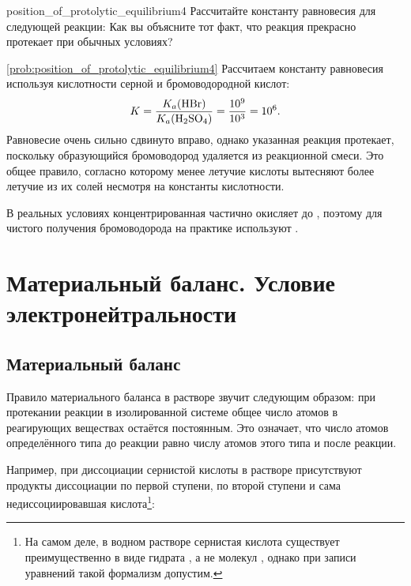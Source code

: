 \begin{problem}{}{position_of_protolytic_equilibrium4}
    Рассчитайте константу равновесия для следующей реакции:
    Как вы объясните тот факт, что реакция
    прекрасно протекает при обычных условиях?
    \begin{sol}{\ref{prob:position_of_protolytic_equilibrium4}}
        Рассчитаем константу равновесия используя кислотности серной и бромоводородной кислот:
        \begin{equation*}
            K = \frac{K_a(\ce{HBr})}{K_a(\ce{H2SO4})} = \frac{\num{e9}}{\num{e3}} = \num{e6}.
        \end{equation*}
        Равновесие очень сильно сдвинуто вправо, однако указанная реакция протекает, поскольку образующийся бромоводород удаляется из реакционной смеси. Это общее правило, согласно которому менее летучие кислоты вытесняют более летучие из их солей несмотря на константы кислотности.

        В реальных условиях концентрированная  частично окисляет  до , поэтому для чистого получения бромоводорода на практике используют .
    \end{sol}
\end{problem}

\clearpage

\section[Материальный баланс. Электронейтральность]{Материальный баланс. Условие электронейтральности}

\subsection*{Материальный баланс}

Правило материального баланса в растворе звучит следующим образом: при протекании реакции в изолированной системе общее число атомов в реагирующих веществах остаётся постоянным. Это означает, что число атомов определённого типа до реакции равно числу атомов этого типа и после реакции.

Например, при диссоциации сернистой кислоты  в растворе присутствуют продукты диссоциации по первой ступени, по второй ступени и сама недиссоциировавшая кислота\footnote{На самом деле, в водном растворе сернистая кислота существует преимущественно в виде гидрата , а не молекул , однако при записи уравнений такой формализм допустим.}:

